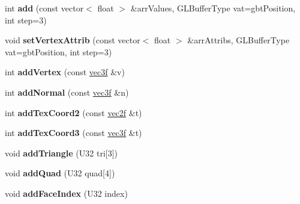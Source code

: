 \begin{DoxyCompactItemize}
\item 
\hypertarget{classps_1_1scene_1_1MeshNode_a4ec9d77bddc3f2e12e40de75da214f0b}{}int {\bfseries add} (const vector$<$ float $>$ \&arr\+Values, G\+L\+Buffer\+Type vat=gbt\+Position, int step=3)\label{classps_1_1scene_1_1MeshNode_a4ec9d77bddc3f2e12e40de75da214f0b}

\item 
\hypertarget{classps_1_1scene_1_1MeshNode_a334b1a7c3117a44c49f4268c62f17eaa}{}void {\bfseries set\+Vertex\+Attrib} (const vector$<$ float $>$ \&arr\+Attribs, G\+L\+Buffer\+Type vat=gbt\+Position, int step=3)\label{classps_1_1scene_1_1MeshNode_a334b1a7c3117a44c49f4268c62f17eaa}

\item 
\hypertarget{classps_1_1scene_1_1MeshNode_a8767136311d4c299bef09e9e74d269fc}{}int {\bfseries add\+Vertex} (const \hyperlink{classps_1_1base_1_1Vec3}{vec3f} \&v)\label{classps_1_1scene_1_1MeshNode_a8767136311d4c299bef09e9e74d269fc}

\item 
\hypertarget{classps_1_1scene_1_1MeshNode_a56419c311e60f061c252de743ddee782}{}int {\bfseries add\+Normal} (const \hyperlink{classps_1_1base_1_1Vec3}{vec3f} \&n)\label{classps_1_1scene_1_1MeshNode_a56419c311e60f061c252de743ddee782}

\item 
\hypertarget{classps_1_1scene_1_1MeshNode_a2e9d316247bac977d6b2ed462ae529a0}{}int {\bfseries add\+Tex\+Coord2} (const \hyperlink{classps_1_1base_1_1Vec2}{vec2f} \&t)\label{classps_1_1scene_1_1MeshNode_a2e9d316247bac977d6b2ed462ae529a0}

\item 
\hypertarget{classps_1_1scene_1_1MeshNode_a224511681ccb6008bff96ed34f9f2f47}{}int {\bfseries add\+Tex\+Coord3} (const \hyperlink{classps_1_1base_1_1Vec3}{vec3f} \&t)\label{classps_1_1scene_1_1MeshNode_a224511681ccb6008bff96ed34f9f2f47}

\item 
\hypertarget{classps_1_1scene_1_1MeshNode_ac9c6f221071dd22c88deb937afb5f4a9}{}void {\bfseries add\+Triangle} (U32 tri\mbox{[}3\mbox{]})\label{classps_1_1scene_1_1MeshNode_ac9c6f221071dd22c88deb937afb5f4a9}

\item 
\hypertarget{classps_1_1scene_1_1MeshNode_a8736493b1bc007c0f924adc83c43c9e7}{}void {\bfseries add\+Quad} (U32 quad\mbox{[}4\mbox{]})\label{classps_1_1scene_1_1MeshNode_a8736493b1bc007c0f924adc83c43c9e7}

\item 
\hypertarget{classps_1_1scene_1_1MeshNode_a5e1b52007eec9bf2310d5c8476fa7901}{}void {\bfseries add\+Face\+Index} (U32 index)\label{classps_1_1scene_1_1MeshNode_a5e1b52007eec9bf2310d5c8476fa7901}


\end{DoxyCompactItemize}
